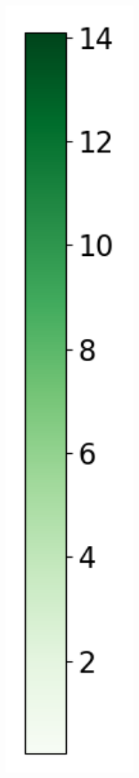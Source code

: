 \begin{figure}[H]
\begin{subfigure}[b]{0.075\textwidth}
        \includegraphics[width=1\textwidth]{Results/kd-laplace/kd-Laplace/seeds-dataset/heatmap_legend_distance.png}
    \end{subfigure}
\end{figure}

